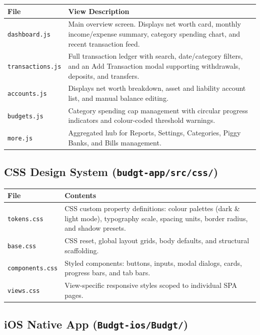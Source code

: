 \documentclass[12pt, a4paper]{article}
\begin{document}
\begin{longtable}{L{3.8cm} L{10.7cm}}
  \toprule
  \textbf{File} & \textbf{View Description} \\
  \midrule
  \endhead
  \texttt{dashboard.js} & Main overview screen. Displays net worth card, monthly income/expense summary, category spending chart, and recent transaction feed. \\[4pt]
  \texttt{transactions.js} & Full transaction ledger with search, date/category filters, and an Add Transaction modal supporting withdrawals, deposits, and transfers. \\[4pt]
  \texttt{accounts.js} & Displays net worth breakdown, asset and liability account list, and manual balance editing. \\[4pt]
  \texttt{budgets.js} & Category spending cap management with circular progress indicators and colour-coded threshold warnings. \\[4pt]
  \texttt{more.js} & Aggregated hub for Reports, Settings, Categories, Piggy Banks, and Bills management. \\
  \bottomrule
\end{longtable}

\subsection{CSS Design System (\texttt{budgt-app/src/css/})}

\begin{longtable}{L{3.8cm} L{10.7cm}}
  \toprule
  \textbf{File} & \textbf{Contents} \\
  \midrule
  \endhead
  \texttt{tokens.css} & CSS custom property definitions: colour palettes (dark \& light mode), typography scale, spacing units, border radius, and shadow presets. \\[4pt]
  \texttt{base.css} & CSS reset, global layout grids, body defaults, and structural scaffolding. \\[4pt]
  \texttt{components.css} & Styled components: buttons, inputs, modal dialogs, cards, progress bars, and tab bars. \\[4pt]
  \texttt{views.css} & View-specific responsive styles scoped to individual SPA pages. \\
  \bottomrule
\end{longtable}

\subsection{iOS Native App (\texttt{Budgt-ios/Budgt/})}
\end{document}
